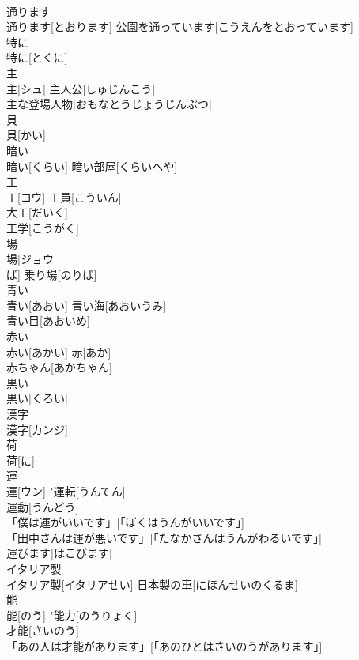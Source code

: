 \documentclass[8pt]{extreport}
\begin{document}
\begin{CJK}{UTF8}{min}
\\	通ります	
\\	通ります[とおります]	公園を通っています[こうえんをとおっています] 
\\	特に	
\\	特に[とくに]	
\\	主	
\\	主[シュ]	主人公[しゅじんこう] 
\\	主な登場人物[おもなとうじょうじんぶつ] 
\\	貝	
\\	貝[かい]	
\\	暗い	
\\	暗い[くらい]	暗い部屋[くらいへや] 
\\	工	
\\	工[コウ]	工員[こういん] 
\\	大工[だいく] 
\\	工学[こうがく] 
\\	場	
\\	場[ジョウ 
\\	ば]	乗り場[のりば] 
\\	青い	
\\	青い[あおい]	青い海[あおいうみ] 
\\	青い目[あおいめ] 
\\	赤い	
\\	赤い[あかい]	赤[あか] 
\\	赤ちゃん[あかちゃん] 
\\	黒い	
\\	黒い[くろい]	
\\	漢字	
\\	漢字[カンジ]	
\\	荷	
\\	荷[に]	
\\	運	
\\	運[ウン]	"運転[うんてん] 
\\	運動[うんどう] 
\\	「僕は運がいいです」[「ぼくはうんがいいです」] 
\\	「田中さんは運が悪いです」[「たなかさんはうんがわるいです」] 
\\	運びます[はこびます] 
\\	イタリア製	
\\	イタリア製[イタリアせい]	日本製の車[にほんせいのくるま] 
\\	能	
\\	能[のう]	"能力[のうりょく] 
\\	才能[さいのう] 
\\	「あの人は才能があります」[「あのひとはさいのうがあります」] 

\end{CJK}
\end{document}
